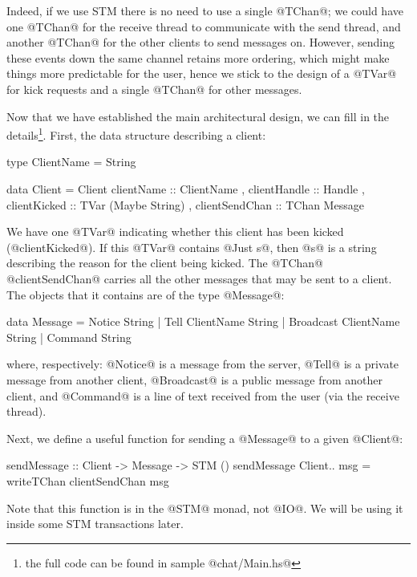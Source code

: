 Indeed, if we use STM there is no need to use a single @TChan@; we
could have one @TChan@ for the receive thread to communicate with the
send thread, and another @TChan@ for the other clients to send
messages on.  However, sending these events down the same channel
retains more ordering, which might make things more predictable for
the user, hence we stick to the design of a @TVar@ for kick requests
and a single @TChan@ for other messages.

Now that we have established the main architectural design, we can
fill in the details\footnote{the full code can be found in sample @chat/Main.hs@}.  First, the data structure describing a client:

\begin{haskell}
type ClientName = String

data Client = Client
  { clientName     :: ClientName
  , clientHandle   :: Handle
  , clientKicked   :: TVar (Maybe String)
  , clientSendChan :: TChan Message
  }
\end{haskell}

\noindent We have one @TVar@ indicating whether this client has been
kicked (@clientKicked@).  If this @TVar@ contains @Just s@, then @s@
is a string describing the reason for the client being kicked.  The
@TChan@ @clientSendChan@ carries all the other messages that may be
sent to a client.  The objects that it contains are of the type
@Message@:

\begin{haskell}
data Message = Notice String
             | Tell ClientName String
             | Broadcast ClientName String
             | Command String
\end{haskell}

\noindent where, respectively: @Notice@ is a message from the server,
@Tell@ is a private message from another client, @Broadcast@ is a
public message from another client, and @Command@ is a line of text
received from the user (via the receive thread).

Next, we define a useful function for sending a @Message@ to a given
@Client@:

\begin{haskell}
sendMessage :: Client -> Message -> STM ()
sendMessage Client{..} msg =
    writeTChan clientSendChan msg
\end{haskell}

\noindent Note that this function is in the @STM@ monad, not @IO@.  We
will be using it inside some STM transactions later.

